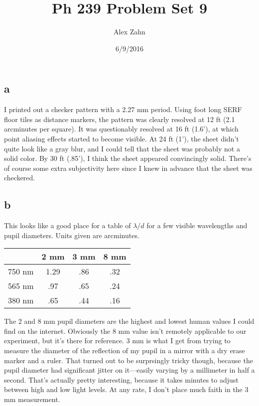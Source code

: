 \documentclass[12pt]{article}
\title{Ph 239 Problem Set 9}
\author{Alex Zahn}
\date{6/9/2016}
\begin{document}
\maketitle

\newcommand{\wmsq}{W/\(\mathrm{m}^2\,\)}
\newcommand{\msq}{\(\mathrm{m}^2\,\)}
\newcommand{\micron}{\(\mu\mathrm{m}\)\,}
\newcommand{\mcb}{\(\mathrm{m}^3\,\)}
\newcommand{\degree}{\(^\circ\,\)}


\section{}

\subsection*{a}

I printed out a checker pattern with a 2.27 mm period. Using foot long SERF floor tiles as distance markers, the pattern was clearly resolved at 12 ft (2.1 arcminutes per square). It was questionably resolved at 16 ft (1.6'), at which point aliasing effects started to become visible. At 24 ft (1'), the sheet didn't quite look like a gray blur, and I could tell that the sheet was probably not a solid color. By 30 ft (.85'), I think the sheet appeared convincingly solid. There's of course some extra subjectivity here since I knew in advance that the sheet was checkered.

\subsection*{b}

This looks like a good place for a table of \(\lambda/d\) for a few visible wavelengths and pupil diameters. Units given are arcminutes.

\begin{center}
\begin{tabular}{|c|c|c|c|}
\hline
 & 2 mm& 3 mm & 8 mm \\ \hline 
750 nm &1.29 &.86 &.32\\ \hline
565 nm &.97 &.65 &.24 \\ \hline
380 nm &.65 &.44 &.16 \\ \hline
\end{tabular}
\end{center}


The 2 and 8 mm pupil diameters are the highest and lowest human values I could find on the internet. Obviously the 8 mm value isn't remotely applicable to our experiment, but it's there for reference. 3 mm is what I get from trying to measure the diameter of the reflection of my pupil in a mirror with a dry erase marker and a ruler. That turned out to be surprsingly tricky though, because the pupil diameter had significant jitter on it---easily varying by a millimeter in half a second. That's actually pretty interesting, because it takes minutes to adjust between high and low light levels. At any rate, I don't place much faith in the 3 mm measurement.
\end{document}
